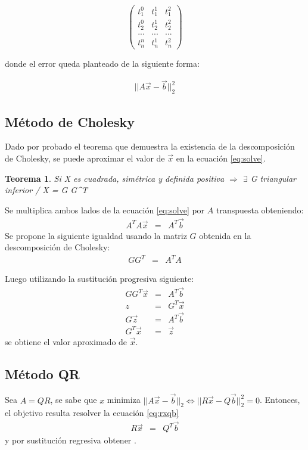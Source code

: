 \documentclass[]{article}
\newtheorem{theorem}{Teorema}
\begin{document}
\[ \left( \begin{array}{ccc}
t_1^0 & t_1^1 & t_1^2 \\
t_2^0 & t_2^1 & t_2^2 \\
... & ... & ... \\
t_n^n & t_n^1 & t_n^2 
\end{array} \right)\] 

donde el error queda planteado de la siguiente forma:

\begin{eqnarray}
    ||A\vec{x}-\vec{b}||_2^2
\end{eqnarray}


\subsection{Método de Cholesky}

\par Dado por probado el teorema que demuestra la existencia de la descomposición de Cholesky, se puede aproximar el valor de $\vec{x}$ en la ecuación \ref{eq:solve}.

\begin{theorem}
\par Si X es cuadrada, simétrica y definida positiva $\Rightarrow$  $\exists$  G  triangular inferior /  X = G G^T
\end{theorem}


\par Se multiplica ambos lados de la ecuación \ref{eq:solve} por $A$ transpuesta obteniendo:
\begin{eqnarray}
    A^T A \vec{x} &=& A^T \vec{b}
\end{eqnarray}
Se propone la siguiente igualdad usando la matriz $G$ obtenida en la descomposición de Cholesky:
\begin{eqnarray}
    G G^T &=& A^T A
\end{eqnarray}
\par Luego utilizando la sustitución progresiva siguiente:
\begin{eqnarray}
    G G^T \vec{x} &=& A^T \vec{b}\\
	z &=& G^T \vec{x}\\
	G \vec{z} &=& A^T \vec{b}\\
	G^T \vec{x} &=& \vec{z}
\end{eqnarray}
se obtiene el valor aproximado de $\vec{x}$.



\subsection{Método QR}
\par
Sea $A = QR$, se sabe que $x$ minimiza $||A\vec{x}-\vec{b}||_2 \Leftrightarrow ||R\vec{x}-Q\vec{b}||^{2}_{2} = 0$.
Entonces, el objetivo resulta resolver la ecuación \ref{eq:rxqb} 
\begin{eqnarray} \label{eq:rxqb}
    R\vec{x} &=& Q^T \vec{b}
\end{eqnarray}
y por sustitución regresiva obtener . 
\end{document}
